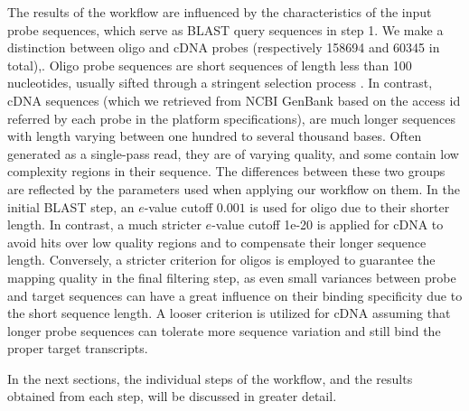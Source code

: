 The results of the workflow are influenced by the characteristics of the input probe sequences, which serve as BLAST query sequences in step 1. We make a distinction between oligo and cDNA probes (respectively 158694 and 60345 in total),. Oligo probe sequences are short sequences of length less than 100 nucleotides, usually sifted through a stringent selection process \cite{Leparc2009,Rouillard2003}.  In contrast, cDNA sequences (which we retrieved from NCBI GenBank based on the access id referred by each probe in the platform specifications), are much longer sequences with length varying between one hundred to several thousand bases. Often generated as a single-pass read, they are of varying quality, and some contain low complexity regions in their sequence. The differences between these two groups are reflected by the parameters used when applying our workflow on them. In the initial BLAST step, an $e$-value cutoff $0.001$ is used for oligo due to their shorter length. In contrast, a much stricter $e$-value cutoff 1e-20 is applied for cDNA to avoid hits over low quality regions and to compensate their longer sequence length. Conversely, a stricter criterion for oligos is employed to guarantee the mapping quality in the final filtering step, as even small variances between probe and target sequences can have a great influence on their binding specificity due to the short sequence length. A looser criterion is utilized for cDNA assuming that longer probe sequences can tolerate more sequence variation and still bind the proper target transcripts.

In the next sections, the individual steps of the workflow, and the results obtained from each step, will be discussed in greater detail.

